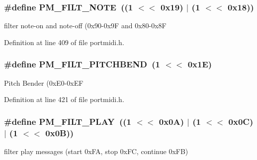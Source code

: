 \subsubsection[{\texorpdfstring{P\+M\+\_\+\+F\+I\+L\+T\+\_\+\+N\+O\+TE}{PM_FILT_NOTE}}]{\setlength{\rightskip}{0pt plus 5cm}\#define P\+M\+\_\+\+F\+I\+L\+T\+\_\+\+N\+O\+TE~((1 $<$$<$ 0x19) $\vert$ (1 $<$$<$ 0x18))}\hypertarget{group__grp__events__filters_ga27d37f62f7ab2674c5c6626a15630b48}{}\label{group__grp__events__filters_ga27d37f62f7ab2674c5c6626a15630b48}
filter note-\/on and note-\/off (0x90-\/0x9F and 0x80-\/0x8F 

Definition at line 409 of file portmidi.\+h.

\subsubsection[{\texorpdfstring{P\+M\+\_\+\+F\+I\+L\+T\+\_\+\+P\+I\+T\+C\+H\+B\+E\+ND}{PM_FILT_PITCHBEND}}]{\setlength{\rightskip}{0pt plus 5cm}\#define P\+M\+\_\+\+F\+I\+L\+T\+\_\+\+P\+I\+T\+C\+H\+B\+E\+ND~(1 $<$$<$ 0x1\+E)}\hypertarget{group__grp__events__filters_gae6615da402e1a1a82b7833c7a30415e4}{}\label{group__grp__events__filters_gae6615da402e1a1a82b7833c7a30415e4}
Pitch Bender (0x\+E0-\/0x\+EF 

Definition at line 421 of file portmidi.\+h.

\subsubsection[{\texorpdfstring{P\+M\+\_\+\+F\+I\+L\+T\+\_\+\+P\+L\+AY}{PM_FILT_PLAY}}]{\setlength{\rightskip}{0pt plus 5cm}\#define P\+M\+\_\+\+F\+I\+L\+T\+\_\+\+P\+L\+AY~((1 $<$$<$ 0x0\+A) $\vert$ (1 $<$$<$ 0x0\+C) $\vert$ (1 $<$$<$ 0x0\+B))}\hypertarget{group__grp__events__filters_gae8733c7af01f94015043c8926076557a}{}\label{group__grp__events__filters_gae8733c7af01f94015043c8926076557a}
filter play messages (start 0x\+FA, stop 0x\+FC, continue 0x\+FB) 

